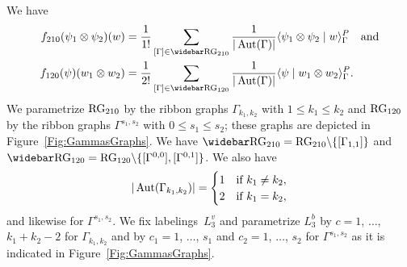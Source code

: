 \documentclass[\MainFolder/Text.tex]{subfiles}
\begin{document}
\begin{Example}\label{Ex:Canon}
We have
\begin{equation}\label{Eq:DefByGraphs}
\begin{aligned}
f_{210}(\psi_1 \otimes \psi_2)(w) & = \frac{1}{1!} \sum_{[\Gamma]\in \RRG_{210}} \frac{1}{\Abs{\Aut(\Gamma)}} \langle \psi_1 \otimes \psi_2 \mid w \rangle_\Gamma^P\quad\text{and} \\
f_{120}(\psi)(w_1 \otimes w_2) & = \frac{1}{2!} \sum_{[\Gamma]\in \RRG_{120}} \frac{1}{\Abs{\Aut(\Gamma)}} \langle \psi \mid w_1 \otimes w_2 \rangle_\Gamma^P.
\end{aligned}
\end{equation}
We parametrize $\mathrm{RG}_{210}$ by the ribbon graphs $\Gamma_{k_1, k_2}$ with $1\le k_1\le k_2$ and $\mathrm{RG}_{120}$ by the ribbon graphs $\Gamma^{s_1, s_2}$ with $0\le s_1 \le s_2$; these graphs are depicted in Figure~\ref{Fig:GammasGraphs}. We have 
$\RRG_{210} = \RG_{210}\backslash \{[\Gamma_{1,1}]\}$ and $\RRG_{120} = \RG_{120}\backslash \{[\Gamma^{0,0}], [\Gamma^{0,1}]\}$. We also have 
$$|\operatorname{Aut}(\Gamma_{k_1,k_2})| = \begin{cases} 1 & \text{if }k_1 \neq k_2, \\ 
              2 & \text{if }k_1 = k_2, \end{cases}$$
and likewise for $\Gamma^{s_1,s_2}$. We fix labelings~$L_{3}^v$ and parametrize $L_{3}^b$ by $c=1$, $\dotsc$, $k_1 + k_2 - 2$ for $\Gamma_{k_1,k_2}$ and by $c_1 = 1$, $\dotsc$, $s_1$ and $c_2 = 1$, $\dotsc$, $s_2$ for $\Gamma^{s_1,s_2}$ as it is indicated in Figure~\ref{Fig:GammasGraphs}.


\end{Example}
\end{document}
